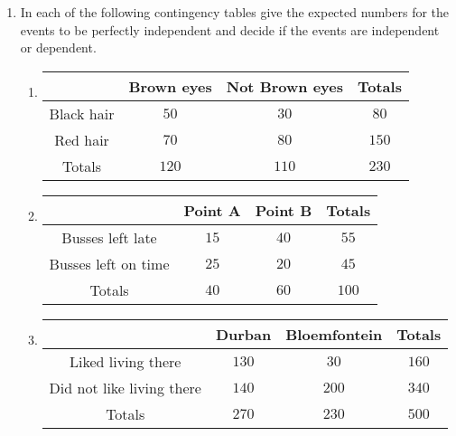 \begin{eocexercises}{}
\begin{enumerate}
\item In each of the following contingency tables give the expected numbers for the events to be perfectly independent and decide if the events are independent or dependent.
	\begin{enumerate}
	\item \begin{center}
\begin{tabular}{|c|c|c|c|}
\hline
           & Brown eyes & Not Brown eyes & Totals \\
\hline
Black hair & $50$         & $30$             & $80 $    \\
Red hair   & $70$         & $80$             & $150 $   \\
\hline
Totals     & $120$        & $110 $           & $230 $   \\
\hline
\end{tabular}
\end{center}

	\item \begin{center}
\begin{tabular}{|c|c|c|c|}
\hline
                    & Point A & Point B & Totals \\
\hline
Busses left late    & $15$      & $40$      & $55$     \\
Busses left on time & $25$      & $20 $     & $45$     \\
\hline
Totals              & $40 $     & $60$      & $100$    \\
\hline
\end{tabular}
\end{center}

	\item \begin{center}
\begin{tabular}{|c|c|c|c|}
\hline
                          & Durban & Bloemfontein & Totals \\
\hline
Liked living there        & $130$    & $30 $          & $160$    \\
Did not like living there & $140 $   & $200 $         & $340$    \\
\hline
Totals                    & $270$   &$ 230 $         & $500$    \\
\hline
\end{tabular}
\end{center}


\end{enumerate}
\end{enumerate}
\end{eocexercises}
